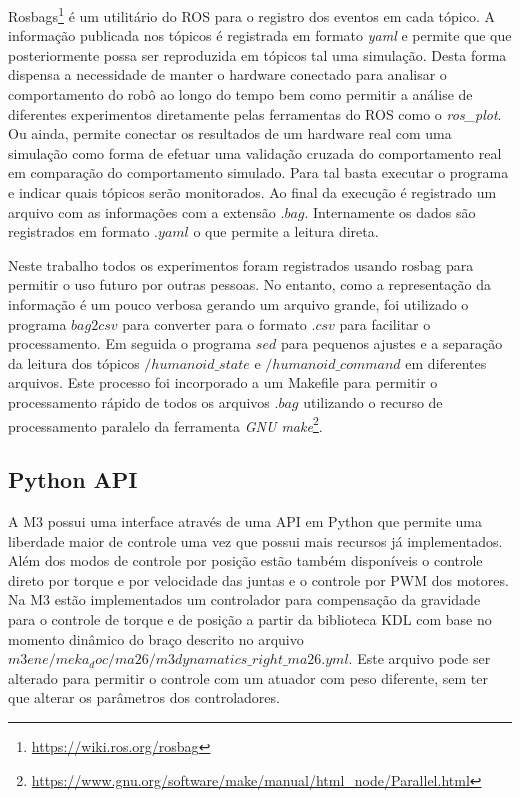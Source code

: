 Rosbags\footnote{\url{https://wiki.ros.org/rosbag}} é um utilitário do ROS para o registro dos eventos em cada tópico. A informação publicada nos tópicos é registrada em formato \textit{yaml} e permite que que posteriormente possa ser reproduzida em tópicos tal uma simulação. Desta forma dispensa a necessidade de manter o hardware conectado para analisar o comportamento do robô ao longo do tempo bem como permitir a análise de diferentes experimentos diretamente pelas ferramentas do ROS como o \textit{ros\_plot}. Ou ainda, permite conectar os resultados de um hardware real com uma simulação como forma de efetuar uma validação cruzada do comportamento real em comparação do comportamento simulado. Para tal basta executar o programa e indicar quais tópicos serão monitorados. Ao final da execução é registrado um arquivo com as informações com a extensão $.bag$. Internamente os dados são registrados em formato $.yaml$ o que permite a leitura direta.

Neste trabalho todos os experimentos foram registrados usando rosbag para permitir o uso futuro por outras pessoas. No entanto, como a representação da informação é um pouco verbosa gerando um arquivo grande, foi utilizado o programa $bag2csv$ para converter para o formato $.csv$ para facilitar o processamento. Em seguida o programa $sed$ para pequenos ajustes e a separação da leitura dos tópicos  $/humanoid\_state$ e $/humanoid\_command$ em diferentes arquivos. Este processo foi incorporado a um Makefile para permitir o processamento rápido de todos os arquivos $.bag$ utilizando o recurso de processamento paralelo da ferramenta \textit{GNU make}\footnote{\url{https://www.gnu.org/software/make/manual/html_node/Parallel.html}}.

\subsection{Python API}

A M3 possui uma interface através de uma API em Python que permite uma liberdade maior de controle uma vez que possui mais recursos já implementados. Além dos modos de controle por posição estão também disponíveis o controle direto por torque e por velocidade das juntas e o controle por PWM dos motores. Na M3 estão implementados um controlador para compensação da gravidade para o controle de torque e de posição a partir da biblioteca KDL com base no momento dinâmico do braço descrito no arquivo $m3ene/meka_doc/ma26/m3dynamatics\_right\_ma26.yml$. Este arquivo pode ser alterado para permitir o controle com um atuador com peso diferente, sem ter que alterar os parâmetros dos controladores.

